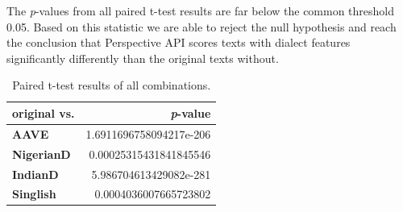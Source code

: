 \documentclass[11pt]{article}
\begin{document}
The \textit{p}-values from all paired t-test results are far below the common threshold 0.05. Based on this statistic we are able to reject the null hypothesis and reach the conclusion that Perspective API scores texts with dialect features significantly differently than the original texts without.

\begin{table}[t]
\centering
\begin{tabular}{lr}
\hline
\textbf{original vs.} & \textbf{\textit{p}-value}        \\ \hline
\textbf{AAVE}         & 1.6911696758094217e-206 \\
\textbf{NigerianD}    & 0.00025315431841845546  \\
\textbf{IndianD}      & 5.986704613429082e-281  \\
\textbf{Singlish}     & 0.0004036007665723802   \\ \hline
\end{tabular}
\caption{Paired t-test results of all combinations.}
\label{paired-overall}
\end{table}
\end{document}
